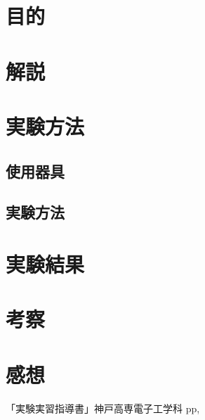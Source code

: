 \documentclass[11pt]{jarticle}
\title{}
\begin{document}
\maketitle

\section{目的}
	
\section{解説}
	\subsection{}
\section{実験方法}
	\subsection{使用器具}
	\subsection{実験方法}
\section{実験結果}
\section{考察}
\section{感想}
\begin{thebibliography}{99}
「実験実習指導書」神戸高専電子工学科 pp,
\end{thebibliography}
\end{document}
